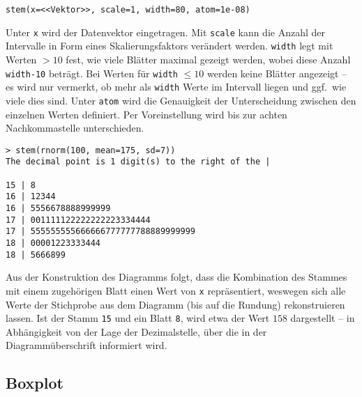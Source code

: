 \begin{lstlisting}
stem(x=<<Vektor>>, scale=1, width=80, atom=1e-08)
\end{lstlisting}

Unter \lstinline!x! wird der Datenvektor eingetragen. Mit \lstinline!scale! kann die Anzahl der Intervalle in Form eines Skalierungsfaktors verändert werden. \lstinline!width! legt mit Werten $> 10$ fest, wie viele Blätter maximal gezeigt werden, wobei diese Anzahl \lstinline!width-10! beträgt. Bei Werten für \lstinline!width! $\leq 10$ werden keine Blätter angezeigt -- es wird nur vermerkt, ob mehr als \lstinline!width! Werte im Intervall liegen und ggf.\ wie viele dies sind. Unter \lstinline!atom! wird die Genauigkeit der Unterscheidung zwischen den einzelnen Werten definiert. Per Voreinstellung wird bis zur achten Nachkommastelle unterschieden.
\begin{lstlisting}
> stem(rnorm(100, mean=175, sd=7))
The decimal point is 1 digit(s) to the right of the |

15 | 8
16 | 12344
16 | 5556678888999999
17 | 001111122222222223334444
17 | 555555555666666777777788889999999
18 | 00001223333444
18 | 5666899
\end{lstlisting}

Aus der Konstruktion des Diagramms folgt, dass die Kombination des Stammes mit einem zugehörigen Blatt einen Wert von \lstinline!x! repräsentiert, weswegen sich alle Werte der Stichprobe aus dem Diagramm (bis auf die Rundung) rekonstruieren lassen. Ist der Stamm \lstinline!15! und ein Blatt \lstinline!8!, wird etwa der Wert $158$ dargestellt -- in Abhängigkeit von der Lage der Dezimalstelle, über die in der Diagrammüberschrift informiert wird.

\subsection{Boxplot}
\label{sec:boxplot}

